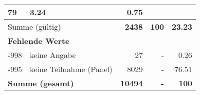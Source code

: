 \begin{longtable}{lXrrr}
       \num{79} &
       \num[round-mode=places,round-precision=2]{3.24} &
         \num[round-mode=places,round-precision=2]{0.75} \\
     \midrule
     \multicolumn{2}{l}{Summe (gültig)} &
       \textbf{\num{2438}} &
     \textbf{\num{100}} &
       \textbf{\num[round-mode=places,round-precision=2]{23.23}} \\
     \multicolumn{5}{l}{\textbf{Fehlende Werte}}\\
       -998 &
       keine Angabe &
         \num{27} &
        - &
         \num[round-mode=places,round-precision=2]{0.26} \\
       -995 &
       keine Teilnahme (Panel) &
         \num{8029} &
        - &
         \num[round-mode=places,round-precision=2]{76.51} \\
     \midrule
     \multicolumn{2}{l}{\textbf{Summe (gesamt)}} &
          \textbf{\num{10494}} &
        \textbf{-} &
        \textbf{\num{100}} \\
     \bottomrule
     \end{longtable}
     
